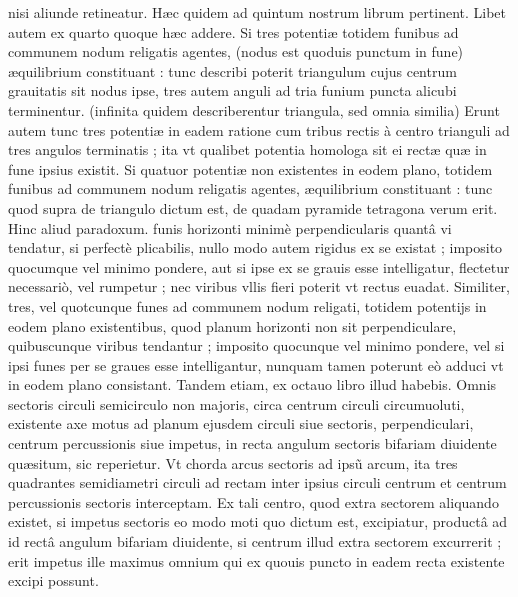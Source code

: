 \documentclass[11pt,a4paper]{article}
\begin{document}


nisi aliunde retineatur. Hæc quidem ad quintum nostrum librum pertinent. Libet autem ex quarto quoque hæc addere. Si tres potentiæ totidem funibus ad communem nodum religatis agentes, (nodus est quoduis punctum in fune) æquilibrium constituant : tunc describi poterit triangulum cujus centrum grauitatis sit nodus ipse, tres autem anguli ad tria funium puncta alicubi terminentur. (infinita quidem describerentur triangula, sed omnia similia) Erunt autem tunc tres potentiæ in eadem ratione cum tribus rectis à centro trianguli ad tres angulos terminatis ; ita vt qualibet potentia homologa sit ei rectæ quæ in fune ipsius existit. Si quatuor potentiæ non existentes in eodem plano, totidem funibus ad communem nodum religatis agentes, æquilibrium constituant : tunc quod supra de triangulo dictum est, de quadam pyramide tetragona verum erit. Hinc aliud paradoxum. funis horizonti minimè perpendicularis quantâ vi tendatur, si perfectè plicabilis, nullo modo autem rigidus ex se existat ; imposito quocumque vel minimo pondere, aut si ipse ex se grauis esse intelligatur, flectetur necessariò, vel rumpetur ; nec viribus vllis fieri poterit vt rectus euadat. Similiter, tres, vel quotcunque funes ad communem nodum religati, totidem potentijs in eodem plano existentibus, quod planum horizonti non sit perpendiculare, quibuscunque viribus tendantur ; imposito quocunque vel minimo pondere, vel si ipsi funes per se graues esse intelligantur, nunquam tamen poterunt eò adduci vt in eodem plano consistant. Tandem etiam, ex octauo libro illud habebis. Omnis sectoris circuli semicirculo non  majoris, circa centrum circuli circumuoluti, existente axe motus ad planum ejusdem circuli siue sectoris, perpendiculari, centrum percussionis siue impetus, in recta angulum sectoris bifariam diuidente quæsitum, sic reperietur. Vt chorda arcus sectoris ad ipsũ arcum, ita tres quadrantes semidiametri circuli ad rectam inter ipsius circuli centrum et centrum percussionis sectoris interceptam. Ex tali centro, quod extra sectorem aliquando existet, si impetus sectoris eo modo moti quo dictum est, excipiatur, productâ ad id rectâ angulum bifariam diuidente, si centrum illud extra sectorem excurrerit ; erit impetus ille maximus omnium qui ex quouis puncto in eadem recta existente excipi possunt.
\end{document}
